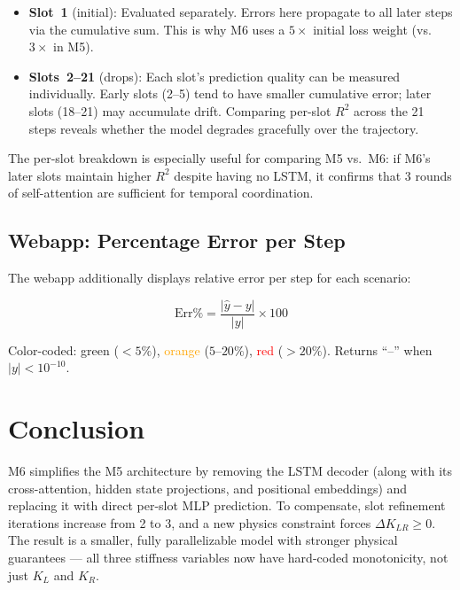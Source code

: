 \documentclass[11pt,a4paper]{article}
\begin{document}
\begin{itemize}[nosep]
    \item \textbf{Slot~1} (initial): Evaluated separately. Errors here propagate to all later steps via the cumulative sum. This is why M6 uses a $5\times$ initial loss weight (vs.\ $3\times$ in M5).
    \item \textbf{Slots~2--21} (drops): Each slot's prediction quality can be measured individually. Early slots (2--5) tend to have smaller cumulative error; later slots (18--21) may accumulate drift. Comparing per-slot $R^2$ across the 21 steps reveals whether the model degrades gracefully over the trajectory.
\end{itemize}

The per-slot breakdown is especially useful for comparing M5 vs.\ M6: if M6's later slots maintain higher $R^2$ despite having no LSTM, it confirms that 3 rounds of self-attention are sufficient for temporal coordination.

\subsection{Webapp: Percentage Error per Step}

The webapp additionally displays relative error per step for each scenario:

\begin{equation}
    \text{Err\%} = \frac{|\hat{y} - y|}{|y|} \times 100
\end{equation}

Color-coded: \textcolor{green!60!black}{green} ($< 5\%$), \textcolor{orange}{orange} ($5$--$20\%$), \textcolor{red}{red} ($> 20\%$). Returns ``--'' when $|y| < 10^{-10}$.

\section{Conclusion}

M6 simplifies the M5 architecture by removing the LSTM decoder (along with its cross-attention, hidden state projections, and positional embeddings) and replacing it with direct per-slot MLP prediction. To compensate, slot refinement iterations increase from 2 to 3, and a new physics constraint forces $\Delta K_{LR} \geq 0$. The result is a smaller, fully parallelizable model with stronger physical guarantees --- all three stiffness variables now have hard-coded monotonicity, not just $K_L$ and $K_R$.
\end{document}
